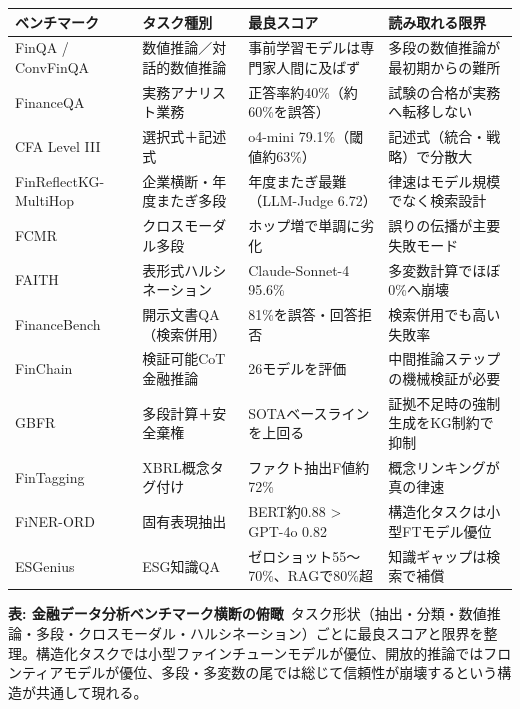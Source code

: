 \begin{center}
\footnotesize
\renewcommand{\arraystretch}{1.3}
\begin{tabular}{@{}p{2.7cm}p{2.6cm}p{3.4cm}p{4.4cm}@{}}
\toprule
\textbf{ベンチマーク} & \textbf{タスク種別} & \textbf{最良スコア} & \textbf{読み取れる限界} \\
\midrule
FinQA / ConvFinQA \cite{x05finqa2021,x05convfinqa2022} & 数値推論／対話的数値推論 & 事前学習モデルは専門家人間に及ばず & 多段の数値推論が最初期からの難所 \\
FinanceQA \cite{x05financeqa2025} & 実務アナリスト業務 & 正答率約40\%（約60\%を誤答） & 試験の合格が実務へ転移しない \\
CFA Level III \cite{x05cfa3eval2025} & 選択式＋記述式 & o4-mini 79.1\%（閾値約63\%） & 記述式（統合・戦略）で分散大 \\
FinReflectKG-MultiHop \cite{x05finreflectkg2025} & 企業横断・年度またぎ多段 & 年度またぎ最難（LLM-Judge 6.72） & 律速はモデル規模でなく検索設計 \\
FCMR \cite{x05fcmr2025} & クロスモーダル多段 & ホップ増で単調に劣化 & 誤りの伝播が主要失敗モード \\
FAITH \cite{x05faith2025} & 表形式ハルシネーション & Claude-Sonnet-4 95.6\% & 多変数計算でほぼ0\%へ崩壊 \\
FinanceBench \cite{financebench2023} & 開示文書QA（検索併用） & 81\%を誤答・回答拒否 & 検索併用でも高い失敗率 \\
FinChain \cite{x05finchain2025} & 検証可能CoT金融推論 & 26モデルを評価 & 中間推論ステップの機械検証が必要 \\
GBFR \cite{x05gbfr2026} & 多段計算＋安全棄権 & SOTAベースラインを上回る & 証拠不足時の強制生成をKG制約で抑制 \\
FinTagging \cite{x05fintagging2025} & XBRL概念タグ付け & ファクト抽出F値約72\% & 概念リンキングが真の律速 \\
FiNER-ORD \cite{x05finerord2025} & 固有表現抽出 & BERT約0.88 > GPT-4o 0.82 & 構造化タスクは小型FTモデル優位 \\
ESGenius \cite{x05esgenius2025} & ESG知識QA & ゼロショット55〜70\%、RAGで80\%超 & 知識ギャップは検索で補償 \\
\bottomrule
\end{tabular}
\end{center}
{\small\color{brandgray}\textbf{表: 金融データ分析ベンチマーク横断の俯瞰}\ タスク形状（抽出・分類・数値推論・多段・クロスモーダル・ハルシネーション）ごとに最良スコアと限界を整理。構造化タスクでは小型ファインチューンモデルが優位、開放的推論ではフロンティアモデルが優位、多段・多変数の尾では総じて信頼性が崩壊するという構造が共通して現れる。}

